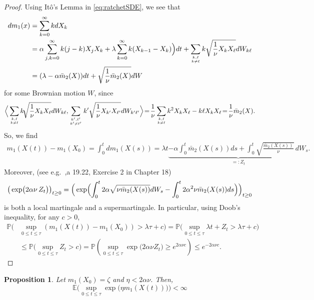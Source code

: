 \documentclass{imsart}
\theoremstyle{plain}
\newtheorem{proposition}[theorem]{Proposition}
\theoremstyle{definition}
\begin{document}
\begin{proof}
Using It\^o's Lemma in \eqref{eq:ratchetSDE}, we see that
\begin{equation}
\label{eq:dm1}
\begin{aligned}
   dm_1(x) & = \sum_{k=0}^\infty k dX_k \\ & = \alpha \sum_{j,k=0}^\infty k(j-k) X_jX_k + \lambda  \sum_{k=0}^\infty k( X_{k-1} -  X_k)\Big)dt + \sum_{k,\ell \atop k \neq \ell} k \sqrt{\frac 1\nu X_k X_\ell} dW_{k\ell} \\ & = (\lambda -\alpha \bar m_2(X)) dt + \sqrt{\frac 1\nu \bar m_2(X)}dW
\end{aligned}    
\end{equation}
for some Brownian motion $W$, since 
\begin{align*}
    \Big\langle \sum_{k, \ell \atop k \neq \ell} k \! \sqrt{\frac 1\nu X_k X_\ell} dW_{k\ell}, \sum_{k', \ell' \atop k' \neq \ell'} k' \sqrt{\frac 1\nu X_{k'} X_{\ell'}} dW_{k'\ell'}  \Big\rangle \!=\! \frac 1\nu \sum_{k,\ell \atop k \neq \ell} k^2 X_k X_\ell - k\ell X_k X_\ell \!=\! \frac 1\nu \bar m_2(X).
\end{align*}
So, we find 
\begin{align*}
m_1(X(t)) - m_1(X_0) = \int_0^t dm_1(X(s)) = \lambda t \underbrace{- \alpha \int_0^t \bar m_2(X(s))ds + \int_{0}^{t} \sqrt{\frac{\bar m_2(X(s))}{\nu}}\, dW_s}_{=:Z_t}.
\end{align*}
Moreover, (see e.g.~\cite{Kallenberg20021},a 19.22, Exercise 2 in Chapter 18)
\[
\big(\exp\bigl(2\alpha \nu\, Z_t\bigr)\big)_{t\geq 0} = 
\Big(\exp\Bigl( \int_0^{t} 2\alpha \sqrt{\nu \bar m_2(X(s))} dW_s - \int_0^{t} 2\alpha^2 \nu \bar m_2(X(s)) ds\Big)\Big)_{t \geq 0}
\]
is both a local martingale and a supermartingale. 
In particular, using Doob's inequality, for any $c>0$,
\begin{align*}
\mathbb P\Big( & \sup_{0 \le t \le \tau} (m_1(X(t)) - m_1(X_0)) > \lambda \tau + c\Big) = \mathbb P\Big( \sup_{0 \le t \le \tau} \lambda t + Z_t > \lambda \tau + c\Big) \\ & \leq \mathbb P\Big( \sup_{0 \le t \le \tau} Z_t > c\Big) = \mathbb P\!\left( \sup_{0 \le t \le \tau} \exp\Big( 2\alpha \nu Z_t \Big) \ge e^{2\alpha \nu c} \right) \leq e^{-2\alpha \nu c}.
\end{align*}
\end{proof}

\begin{proposition}
\label{P:bound}
Let $m_1(X_0) = \zeta$ and $\eta < 2\alpha \nu$. Then, 
$$ \mathbb E\Big( \sup_{0 \leq t\leq \tau} \exp\Big(\eta  m_1(X(t))\Big) \Big) < \infty$$
\end{proposition}
\end{document}
